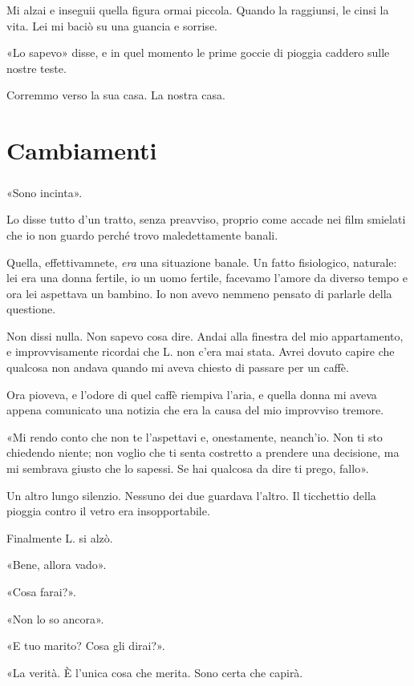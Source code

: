\documentclass[a4paper,12pt]{book}
\begin{document}
Mi alzai e inseguii quella figura ormai piccola. Quando la raggiunsi, le cinsi
la vita. Lei mi baciò su una guancia e sorrise.

«Lo sapevo» disse, e in quel momento le prime goccie di pioggia caddero sulle
nostre teste.

Corremmo verso la sua casa. La nostra casa.

\chapter{Cambiamenti}

\paragraph{}
«Sono incinta».

Lo disse tutto d'un tratto, senza preavviso, proprio come accade nei film
smielati che io non guardo perché trovo maledettamente banali.

Quella, effettivamnete, \emph{era} una situazione banale. Un fatto fisiologico,
naturale: lei era una donna fertile, io un uomo fertile, facevamo l'amore da
diverso tempo e ora lei aspettava un bambino. Io non avevo nemmeno pensato di
parlarle della questione.

Non dissi nulla. Non sapevo cosa dire. Andai alla finestra del mio appartamento,
e improvvisamente ricordai che L. non c'era mai stata. Avrei dovuto capire che
qualcosa non andava quando mi aveva chiesto di passare per un caffè.

Ora pioveva, e l'odore di quel caffè riempiva l'aria, e quella donna mi aveva
appena comunicato una notizia che era la causa del mio improvviso tremore.

«Mi rendo conto che non te l'aspettavi e, onestamente, neanch'io. Non ti sto
chiedendo niente; non voglio che ti senta costretto a prendere una decisione,
ma mi sembrava giusto che lo sapessi. Se hai qualcosa da dire ti prego, fallo».

Un altro lungo silenzio. Nessuno dei due guardava l'altro. Il ticchettio della
pioggia contro il vetro era insopportabile.

Finalmente L. si alzò.

«Bene, allora vado».

«Cosa farai?».

«Non lo so ancora».

«E tuo marito? Cosa gli dirai?».

«La verità. È l'unica cosa che merita. Sono certa che capirà.
\end{document}
